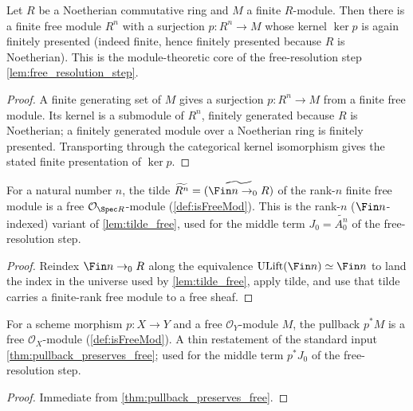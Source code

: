 \begin{lemma}
  \label{lem:finiteFreePresentation_noetherian}
  Let $R$ be a Noetherian commutative ring and $M$ a finite $R$-module. Then
  there is a finite free module $R^n$ with a surjection $p : R^n \to M$ whose
  kernel $\ker p$ is again finitely presented (indeed finite, hence finitely
  presented because $R$ is Noetherian). This is the module-theoretic core of the
  free-resolution step \cref{lem:free_resolution_step}.
  \begin{proof}
    A finite generating set of $M$ gives a surjection $p : R^n \to M$ from a
    finite free module. Its kernel is a submodule of $R^n$, finitely generated
    because $R$ is Noetherian; a finitely generated module over a Noetherian ring
    is finitely presented. Transporting through the categorical kernel
    isomorphism gives the stated finite presentation of $\ker p$.
  \end{proof}
\end{lemma}

\begin{lemma}
  \label{lem:tilde_free_fin}
  For a natural number $n$, the tilde $\widetilde{R^n} = \widetilde{(\Fin n \to_0
  R)}$ of the rank-$n$ finite free module is a free $\mathcal{O}_{\Spec R}$-module
  (\cref{def:isFreeMod}). This is the rank-$n$ ($\Fin n$-indexed) variant of
  \cref{lem:tilde_free}, used for the middle term $J_0 = \widetilde{A_0^n}$ of the
  free-resolution step.
  \begin{proof}
    Reindex $\Fin n \to_0 R$ along the equivalence $\mathrm{ULift}(\Fin n) \simeq
    \Fin n$ to land the index in the universe used by \cref{lem:tilde_free}, apply
    tilde, and use that tilde carries a finite-rank free module to a free sheaf.
  \end{proof}
\end{lemma}

\begin{lemma}
  \label{lem:pullback_isFreeMod}
  For a scheme morphism $p : X \to Y$ and a free $\mathcal{O}_Y$-module $M$, the
  pullback $p^* M$ is a free $\mathcal{O}_X$-module (\cref{def:isFreeMod}). A thin
  restatement of the standard input \cref{thm:pullback_preserves_free}; used for the
  middle term $p^* J_0$ of the free-resolution step.
  \begin{proof}
    Immediate from \cref{thm:pullback_preserves_free}.
  \end{proof}
\end{lemma}

